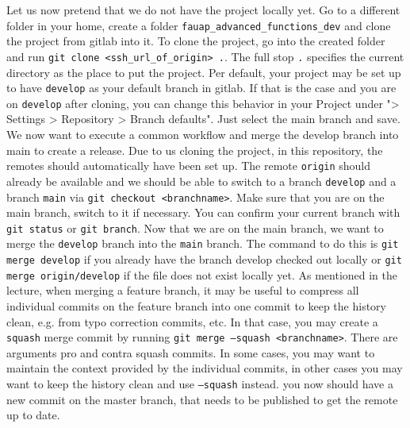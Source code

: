 \documentclass[]{erlangen-problemset}
\begin{document}

\begin{problem}[title={Cloning the project again from the remote and setting up a release}]
\noindent Let us now pretend that we do not have the project locally yet. 
Go to a different folder in your home, create a folder \texttt{fauap\_advanced\_functions\_dev} and clone the project from gitlab into it.
\Question To clone the project, go into the created folder and run \texttt{git clone <ssh\_url\_of\_origin> .}. 
The full stop \texttt{.} specifies the current directory as the place to put the project.
Per default, your project may be set up to have \texttt{develop} as your default branch in gitlab. 
If that is the case and you are on \texttt{develop} after cloning, you can change this behavior in your Project under "> Settings > Repository > Branch defaults".
Just select the main branch and save. 
\Question We now want to execute a common workflow and merge the develop branch into main to create a release. 
Due to us cloning the project, in this repository, the remotes should automatically have been set up. 
The remote \texttt{origin} should already be available and we should be able to switch to a branch \texttt{develop} and a branch \texttt{main} via \texttt{git checkout <branchname>}.
Make sure that you are on the main branch, switch to it if necessary. 
You can confirm your current branch with \texttt{git status} or \texttt{git branch}.
Now that we are on the main branch, we want to merge the \texttt{develop} branch into the \texttt{main} branch.
The command to do this is \texttt{git merge develop} if you already have the branch develop checked out locally or \texttt{git merge origin/develop} if the file does not exist locally yet. 
As mentioned in the lecture, when merging a feature branch, it may be useful to compress all individual commits on the feature branch into one commit to keep the history clean, e.g. from typo correction commits, etc.
In that case, you may create a \texttt{squash} merge commit by running \texttt{git merge --squash <branchname>}. 
There are arguments pro and contra squash commits. 
In some cases, you may want to maintain the context provided by the individual commits, in other cases you may want to keep the history clean and use \texttt{--squash} instead. 
\Question you now should have a new commit on the master branch, that needs to be published to get the remote up to date. 

\end{problem}
\end{document}
